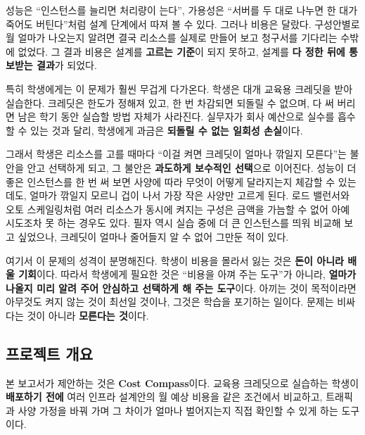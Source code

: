 \documentclass[10pt,a4paper]{article}
\begin{document}
성능은 ``인스턴스를 늘리면 처리량이 는다'', 가용성은 ``서버를 두 대로 나누면 한 대가 죽어도 버틴다''처럼 설계 단계에서 따져 볼 수 있다. 그러나 비용은 달랐다. 구성안별로 월 얼마가 나오는지 알려면 결국 리소스를 실제로 만들어 보고 청구서를 기다리는 수밖에 없었다. 그 결과 비용은 설계를 \textbf{고르는 기준}이 되지 못하고, 설계를 \textbf{다 정한 뒤에 통보받는 결과}가 되었다.

특히 학생에게는 이 문제가 훨씬 무겁게 다가온다. 학생은 대개 교육용 크레딧을 받아 실습한다. 크레딧은 한도가 정해져 있고, 한 번 차감되면 되돌릴 수 없으며, 다 써 버리면 남은 학기 동안 실습할 방법 자체가 사라진다. 실무자가 회사 예산으로 실수를 흡수할 수 있는 것과 달리, 학생에게 과금은 \textbf{되돌릴 수 없는 일회성 손실}이다.

그래서 학생은 리소스를 고를 때마다 ``이걸 켜면 크레딧이 얼마나 깎일지 모른다''는 불안을 안고 선택하게 되고, 그 불안은 \textbf{과도하게 보수적인 선택}으로 이어진다. 성능이 더 좋은 인스턴스를 한 번 써 보면 사양에 따라 무엇이 어떻게 달라지는지 체감할 수 있는데도, 얼마가 깎일지 모르니 겁이 나서 가장 작은 사양만 고르게 된다. 로드 밸런서와 오토 스케일링처럼 여러 리소스가 동시에 켜지는 구성은 금액을 가늠할 수 없어 아예 시도조차 못 하는 경우도 있다. 필자 역시 실습 중에 더 큰 인스턴스를 띄워 비교해 보고 싶었으나, 크레딧이 얼마나 줄어들지 알 수 없어 그만둔 적이 있다.

여기서 이 문제의 성격이 분명해진다. 학생이 비용을 몰라서 잃는 것은 \textbf{돈이 아니라 배울 기회}이다. 따라서 학생에게 필요한 것은 ``비용을 아껴 주는 도구''가 아니라, \textbf{얼마가 나올지 미리 알려 주어 안심하고 선택하게 해 주는 도구}이다. 아끼는 것이 목적이라면 아무것도 켜지 않는 것이 최선일 것이나, 그것은 학습을 포기하는 일이다. 문제는 비싸다는 것이 아니라 \textbf{모른다는 것}이다.

\subsection{프로젝트 개요}

본 보고서가 제안하는 것은 \textbf{Cost Compass}이다. 교육용 크레딧으로 실습하는 학생이 \textbf{배포하기 전에} 여러 인프라 설계안의 월 예상 비용을 같은 조건에서 비교하고, 트래픽과 사양 가정을 바꿔 가며 그 차이가 얼마나 벌어지는지 직접 확인할 수 있게 하는 도구이다.
\end{document}
